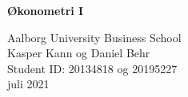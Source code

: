 \documentclass[
  10pt,
]{article}
\author{}
\date{\vspace{-2.5em}}
\begin{document}

\begin{centering}

\vspace{2 cm}

\Large

{\bf Økonometri I}

\vspace{2 cm}

\Large


\vspace{2 cm}

\normalsize


\vspace{12 cm}

\normalsize
Aalborg University Business School \\
Kasper Kann og Daniel Behr \\
Student ID: 20134818 og 20195227 \\
juli 2021

\vspace{2 cm}



\vspace{2 cm}


\end{centering}

\newpage

\pagestyle{fancy}

\fancyhead[LE,RO]{}
\fancyhead[LO,RE]{}

\renewcommand{\headrulewidth}{0.4pt}
\renewcommand{\footrulewidth}{0pt}


\FloatBarrier
\newpage

\FloatBarrier
\newpage


\setcounter{tocdepth}{4}

\tableofcontents

\newpage
\FloatBarrier


\FloatBarrier



\end{document}
